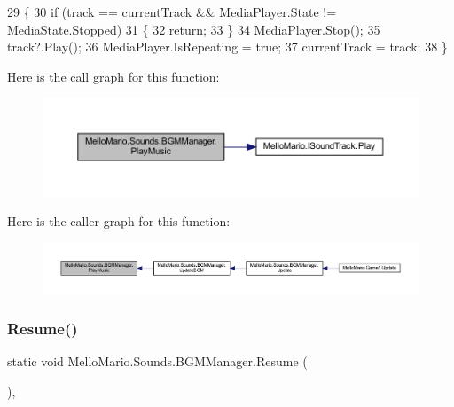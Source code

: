 \begin{DoxyCode}
29         \{
30             \textcolor{keywordflow}{if} (track == currentTrack && MediaPlayer.State != MediaState.Stopped)
31             \{
32                 \textcolor{keywordflow}{return};
33             \}
34             MediaPlayer.Stop();
35             track?.Play();
36             MediaPlayer.IsRepeating = \textcolor{keyword}{true};
37             currentTrack = track;
38         \}
\end{DoxyCode}
Here is the call graph for this function\+:
\nopagebreak
\begin{figure}[H]
\begin{center}
\leavevmode
\includegraphics[width=350pt]{classMelloMario_1_1Sounds_1_1BGMManager_ae9869dc2745c334f5a7d0ab0d34e92e3_cgraph}
\end{center}
\end{figure}
Here is the caller graph for this function\+:
\nopagebreak
\begin{figure}[H]
\begin{center}
\leavevmode
\includegraphics[width=350pt]{classMelloMario_1_1Sounds_1_1BGMManager_ae9869dc2745c334f5a7d0ab0d34e92e3_icgraph}
\end{center}
\end{figure}
\mbox{\label{classMelloMario_1_1Sounds_1_1BGMManager_a8c1ad558e3c5de4cdc6b8615c9f73a7e}} 
\subsubsection{Resume()}
{\footnotesize\ttfamily static void Mello\+Mario.\+Sounds.\+B\+G\+M\+Manager.\+Resume (\begin{DoxyParamCaption}{ }\end{DoxyParamCaption})\hspace{0.3cm}{\ttfamily [static]}, {\ttfamily [private]}}



